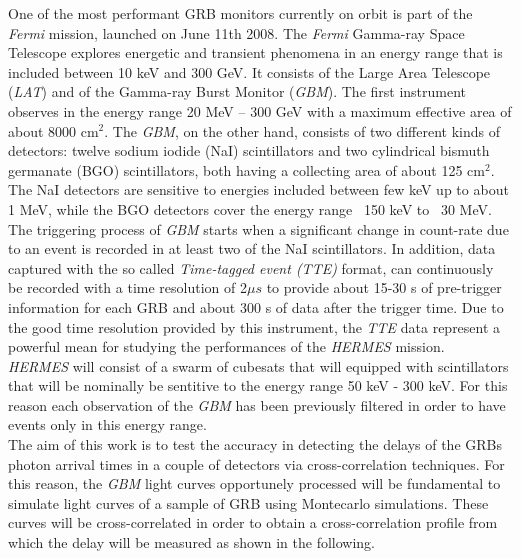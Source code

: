 \documentclass[]{spie}  %
\def \her{\textit{HERMES}\xspace}
\def \Fermi{\textit{Fermi}\xspace}
\def \gbm{\textit{GBM}\xspace}
\def \us{$\mu s$\xspace}
\begin{document}
One of the most performant GRB monitors currently on orbit is part of the \Fermi mission, launched on June 11th 2008.
The \Fermi Gamma-ray Space Telescope explores energetic and transient phenomena in an energy range that is included between 10 keV and 300 GeV. It consists of the Large Area Telescope (\textit{LAT}) and of the  Gamma-ray Burst Monitor (\gbm). The first instrument observes in the energy range 20 MeV – 300 GeV with a maximum effective area of about 8000 cm$^2$. 
The \gbm, on the other hand, consists of two different kinds of detectors: twelve sodium iodide (NaI) scintillators and two cylindrical bismuth germanate (BGO) scintillators, both having a collecting area of about 125 cm$^2$. The NaI detectors are sensitive to energies included between few keV up to about 1 MeV, while the BGO detectors cover the energy range ~150 keV to ~30 MeV.
The triggering process of \gbm starts when a significant change in count-rate due to an event is recorded in at least two of the NaI scintillators. In addition, data captured with the so called \textit{Time-tagged event (TTE)} format, can continuously be recorded with a time resolution of 2\us to provide about 15-30 s of pre-trigger information for each GRB and about 300 s of data after the trigger time.
Due to the good time resolution provided by this instrument, the \textit{TTE} data represent a powerful mean for studying the performances of the \her mission.\\
\her will consist of a swarm of cubesats that will equipped with scintillators that will be nominally be sentitive to the energy range 50 keV - 300 keV. For this reason each observation of the \gbm has been previously filtered in order to have events only in this energy range. \\

The aim of this work is to test the accuracy in detecting the delays of the GRBs photon arrival times in a couple of detectors via cross-correlation techniques. For this reason, the \gbm light curves opportunely processed will be fundamental to simulate light curves of a sample of GRB using Montecarlo simulations. These curves will be cross-correlated in order to obtain a cross-correlation profile from which the delay will be measured as shown in the following. \\
\end{document}

